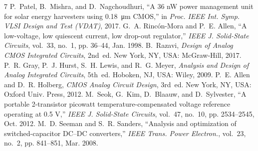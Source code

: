 \documentclass[conference]{IEEEtran}
\begin{document}
\begin{thebibliography}{7}
P.~Patel, B.~Mishra, and D.~Nagchoudhuri, ``A 36 nW power management unit for
solar energy harvesters using 0.18~\si{\micro\metre} CMOS,'' in \emph{Proc.
IEEE Int. Symp. VLSI Design and Test (VDAT)}, 2017.
G.~A. Rinc\'on-Mora and P.~E. Allen, ``A low-voltage, low quiescent current,
low drop-out regulator,'' \emph{IEEE J. Solid-State Circuits}, vol.~33,
no.~1, pp. 36--44, Jan. 1998.
B.~Razavi, \emph{Design of Analog CMOS Integrated Circuits}, 2nd~ed. New
York, NY, USA: McGraw-Hill, 2017.
P.~R. Gray, P.~J. Hurst, S.~H. Lewis, and R.~G. Meyer, \emph{Analysis and
Design of Analog Integrated Circuits}, 5th~ed. Hoboken, NJ, USA: Wiley, 2009.
P.~E. Allen and D.~R. Holberg, \emph{CMOS Analog Circuit Design}, 3rd~ed.
New York, NY, USA: Oxford Univ. Press, 2012.
M.~Seok, G.~Kim, D.~Blaauw, and D.~Sylvester, ``A portable 2-transistor
picowatt temperature-compensated voltage reference operating at 0.5 V,''
\emph{IEEE J. Solid-State Circuits}, vol.~47, no.~10, pp. 2534--2545, Oct.
2012.
M.~D. Seeman and S.~R. Sanders, ``Analysis and optimization of
switched-capacitor DC--DC converters,'' \emph{IEEE Trans. Power Electron.},
vol.~23, no.~2, pp. 841--851, Mar. 2008.
\end{thebibliography}
\end{document}
